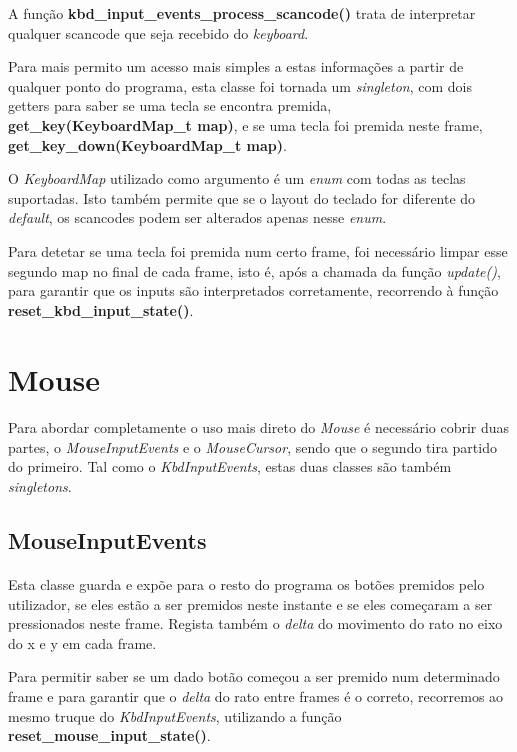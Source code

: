 \documentclass{report}
\begin{document}
A função \textbf{kbd\_input\_events\_process\_scancode()} trata de interpretar qualquer scancode que seja recebido do \textit{keyboard}.

Para mais permito um acesso mais simples a estas informações a partir de qualquer ponto do programa, esta classe foi tornada um \textit{singleton}, com dois getters para saber se uma tecla se encontra premida, \textbf{get\_key(KeyboardMap\_t map)}, e se uma tecla foi premida neste frame, \textbf{get\_key\_down(KeyboardMap\_t map)}.

O \textit{KeyboardMap} utilizado como argumento é um \textit{enum} com todas as teclas suportadas. Isto também permite que se o layout do teclado for diferente do \textit{default}, os scancodes podem ser alterados apenas nesse \textit{enum}.

Para detetar se uma tecla foi premida num certo frame, foi necessário limpar esse segundo map no final de cada frame, isto é, após a chamada da função \textit{update()}, para garantir que os inputs são interpretados corretamente, recorrendo à função \textbf{reset\_kbd\_input\_state()}.

\section{Mouse}

\paragraph{}
Para abordar completamente o uso mais direto do \textit{Mouse} é necessário cobrir duas partes, o \textit{MouseInputEvents} e o \textit{MouseCursor}, sendo que o segundo tira partido do primeiro.
Tal como o \textit{KbdInputEvents}, estas duas classes são também \textit{singletons}.

\subsection{MouseInputEvents}

\paragraph{}
Esta classe guarda e expõe para o resto do programa os botões premidos pelo utilizador, se eles estão a ser premidos neste instante e se eles começaram a ser pressionados neste frame. Regista também o \textit{delta} do movimento do rato no eixo do x e y em cada frame.

Para permitir saber se um dado botão começou a ser premido num determinado frame e para garantir que o \textit{delta} do rato entre frames é o correto, recorremos ao mesmo truque do \textit{KbdInputEvents}, utilizando a função \textbf{reset\_mouse\_input\_state()}.
\end{document}
